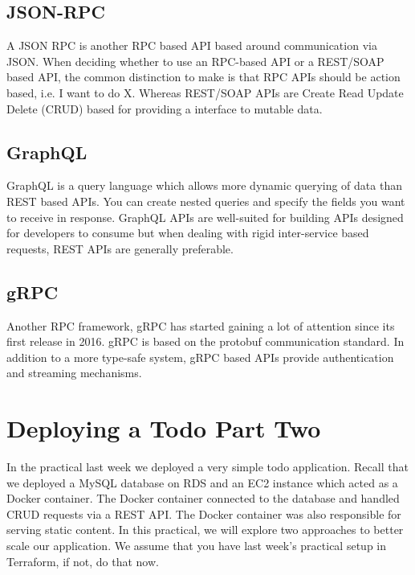 \documentclass{csse4400}
\begin{document}
\subsection{JSON-RPC}
A JSON RPC is another RPC based API based around communication via JSON.
When deciding whether to use an RPC-based API or a REST/SOAP based API,
the common distinction to make is that RPC APIs should be action based, i.e. I want to do X.
Whereas REST/SOAP APIs are Create Read Update Delete (CRUD) based for providing a interface to mutable data.

\subsection{GraphQL}
GraphQL is a query language which allows more dynamic querying of data than REST based APIs.
You can create nested queries and specify the fields you want to receive in response.
GraphQL APIs are well-suited for building APIs designed for developers to consume but when dealing with rigid inter-service based requests,
REST APIs are generally preferable.

\subsection{gRPC}
Another RPC framework, gRPC has started gaining a lot of attention since its first release in 2016.
gRPC is based on the protobuf communication standard.
In addition to a more type-safe system,
gRPC based APIs provide authentication and streaming mechanisms.

\section{Deploying a Todo Part Two}

In the practical last week we deployed a very simple todo application.
Recall that we deployed a MySQL database on RDS and an EC2 instance which acted as a Docker container.
The Docker container connected to the database and handled CRUD requests via a REST API.
The Docker container was also responsible for serving static content.
In this practical, we will explore two approaches to better scale our application.
We assume that you have last week's practical setup in Terraform, if not, do that now.

\end{document}
